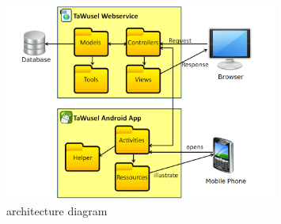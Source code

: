 \begin{figure}[ht]
	\centering
	\includegraphics[width=0.8\textwidth]{images/Architekturdiagramm}
	\caption{architecture diagram}
	\label{img:Arch}
\end{figure}

